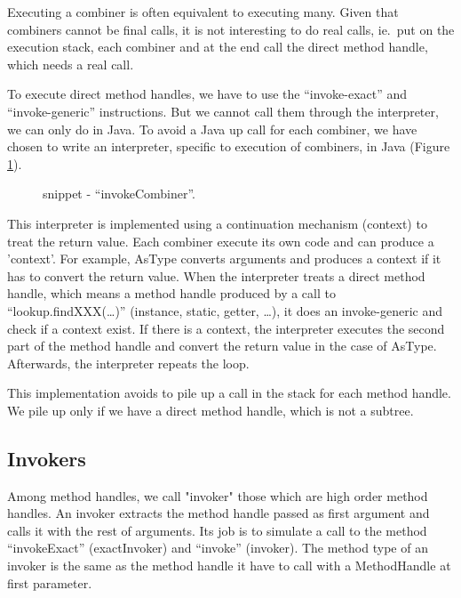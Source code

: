 \documentclass{sig-alternate}
\begin{document}
      Executing a combiner is often equivalent to executing many.
      Given that combiners cannot be final calls,
      it is not interesting to do real calls, ie.~put on the execution stack,
      each combiner and at the end call the direct method handle, which needs a real call.

      To execute direct method handles, we have to use the ``invoke-exact'' and ``invoke-generic'' instructions.
      But we cannot call them through the interpreter, we can only do in Java.
      To avoid a Java up call for each combiner, we have chosen to write an interpreter,
      specific to execution of combiners, in Java (Figure \ref{implINTERP}).

      \begin{figure}[!h]
        \centering \vspace{-1em}
        \caption{snippet - ``invokeCombiner''.}
        \label{implINTERP}
      \end{figure}

      This interpreter is implemented using a continuation mechanism (context) to treat the return value.
      Each combiner execute its own code and can produce a 'context'.
      For example, AsType converts arguments and produces a context if it has to convert the return value.
      When the interpreter treats a direct method handle,
      which means a method handle produced by a call to ``lookup.findXXX(\dots)'' (instance, static, getter, \dots),
      it does an invoke-generic and check if a context exist.
      If there is a context, the interpreter executes the second part of the method handle
      and convert the return value in the case of AsType.
      Afterwards, the interpreter repeats the loop.

      This implementation avoids to pile up a call in the stack for each method handle.
      We pile up only if we have a direct method handle, which is not a subtree.

    \subsection{Invokers}
     \label{invokers}

      Among method handles, we call "invoker" those which are high order method handles.
      An invoker extracts the method handle passed as first argument and calls it with the rest of arguments.
      Its job is to simulate a call to the method ``invokeExact'' (exactInvoker) and ``invoke'' (invoker).
      The method type of an invoker is the same as the method handle it have to call with a MethodHandle at first parameter.
\end{document}
